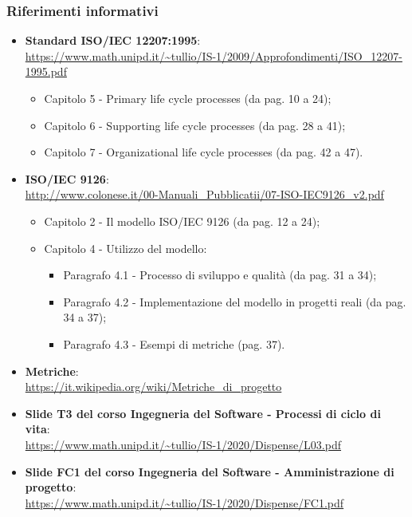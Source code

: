 \subsubsection{Riferimenti informativi}
\label{riferimenti}
\begin{itemize}
	\item \textbf{Standard ISO/IEC 12207:1995}: \\
	\textcolor{blue}{\url{https://www.math.unipd.it/~tullio/IS-1/2009/Approfondimenti/ISO_12207-1995.pdf}}
	\begin{itemize}
		\item Capitolo 5 - Primary life cycle processes (da pag. 10 a 24);
		\item Capitolo 6 - Supporting life cycle processes (da pag. 28 a 41);
		\item Capitolo 7 - Organizational life cycle processes (da pag. 42 a 47).
	\end{itemize}
	\item \textbf{ISO/IEC 9126}: \\
	\textcolor{blue}{\url{http://www.colonese.it/00-Manuali_Pubblicatii/07-ISO-IEC9126_v2.pdf}}
	\begin{itemize}
		\item Capitolo 2 - Il modello ISO/IEC 9126 (da pag. 12 a 24);
		\item Capitolo 4 - Utilizzo del modello:
		\begin{itemize}
			\item Paragrafo 4.1 - Processo di sviluppo e qualità (da pag. 31 a 34);
			\item Paragrafo 4.2 - Implementazione del modello in progetti reali (da pag. 34 a 37);
			\item Paragrafo 4.3 - Esempi di metriche (pag. 37).
		\end{itemize}
	\end{itemize}
	\item \textbf{Metriche}:\\ \textcolor{blue}{\url{https://it.wikipedia.org/wiki/Metriche_di_progetto}}
		\item \textbf{Slide T3 del corso Ingegneria del Software - Processi di ciclo di vita}:\\
	\textcolor{blue}{\url{https://www.math.unipd.it/~tullio/IS-1/2020/Dispense/L03.pdf}}
	\item \textbf{Slide FC1 del corso Ingegneria del Software - Amministrazione di progetto}:\\
	\textcolor{blue}{\url{https://www.math.unipd.it/~tullio/IS-1/2020/Dispense/FC1.pdf}}
	

\end{itemize}
